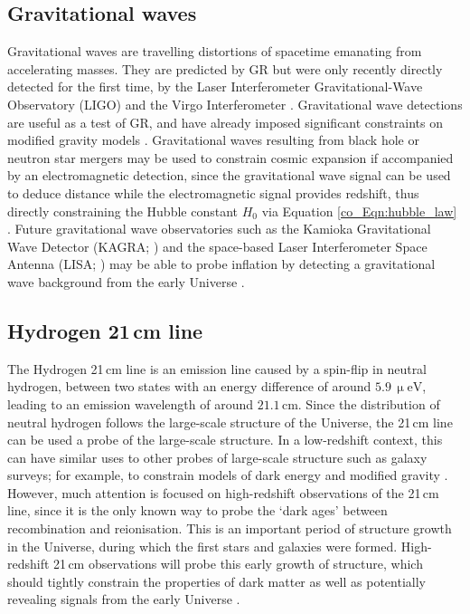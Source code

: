\subsection{Gravitational waves}

Gravitational waves are travelling distortions of spacetime emanating from accelerating masses. They are predicted by GR \citep{Einstein1916, Einstein1918} but were only recently directly detected for the first time, by the Laser Interferometer Gravitational-Wave Observatory (LIGO) and the Virgo Interferometer \citep{Abramovici1992, Accadia2012, Abbott2016}. Gravitational wave detections are useful as a test of GR, and have already imposed significant constraints on modified gravity models \citep{Blas2016, Vainio2017, Arai2018, Battye2018, Ma2019}. Gravitational waves resulting from black hole or neutron star mergers may be used to constrain cosmic expansion if accompanied by an electromagnetic detection, since the gravitational wave signal can be used to deduce distance while the electromagnetic signal provides redshift, thus directly constraining the Hubble constant $H_0$ via Equation \eqref{co_Eqn:hubble_law} \citep{Abbott2017}. Future gravitational wave observatories such as the Kamioka Gravitational Wave Detector (KAGRA; \citealt{Akutsu2019}) and the space-based Laser Interferometer Space Antenna (LISA; \citealt{Amaro-Seoane2017}) may be able to probe inflation by detecting a gravitational wave background from the early Universe \citep{Bartolo2016, Caprini2019, Maggiore2020, Kawamura2021}.

\subsection{Hydrogen 21\texorpdfstring{\,}{ }cm line}

The Hydrogen 21\,cm line is an emission line caused by a spin-flip in neutral hydrogen, between two states with an energy difference of around $5.9\,\upmu\text{eV}$, leading to an emission wavelength of around $21.1$\,cm.
Since the distribution of neutral hydrogen follows the large-scale structure of the Universe, the 21\,cm line can be used a probe of the large-scale structure. In a low-redshift context, this can have similar uses to other probes of large-scale structure such as galaxy surveys; for example, to constrain models of dark energy and modified gravity \citep{Hall2013, Bull2015}. However, much attention is focused on high-redshift observations of the 21\,cm line, since it is the only known way to probe the `dark ages' between recombination and reionisation. This is an important period of structure growth in the Universe, during which the first stars and galaxies were formed.
High-redshift 21\,cm observations will probe this early growth of structure, which should tightly constrain the properties of dark matter as well as potentially revealing signals from the early Universe \citep{Furlanetto2006, Pritchard2012}.

